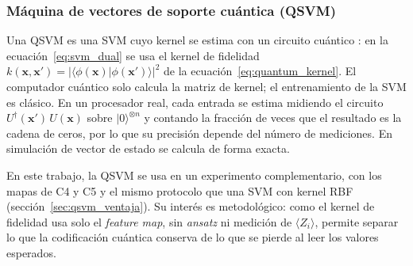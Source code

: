 
\subsubsection{Máquina de vectores de soporte cuántica (QSVM)}
\label{sec:qsvm}

Una QSVM es una SVM cuyo kernel se estima con un circuito cuántico \cite{havlicek2019supervised}: en la ecuación~\eqref{eq:svm_dual} se usa el kernel de fidelidad $k(\mathbf{x},\mathbf{x}') = |\langle \phi(\mathbf{x}) | \phi(\mathbf{x}') \rangle|^2$ de la ecuación~\eqref{eq:quantum_kernel}. El computador cuántico solo calcula la matriz de kernel; el entrenamiento de la SVM es clásico. En un procesador real, cada entrada se estima midiendo el circuito $U^{\dagger}(\mathbf{x}')\,U(\mathbf{x})$ sobre $|0\rangle^{\otimes n}$ y contando la fracción de veces que el resultado es la cadena de ceros, por lo que su precisión depende del número de mediciones. En simulación de vector de estado se calcula de forma exacta.

En este trabajo, la QSVM se usa en un experimento complementario, con los mapas de C4 y C5 y el mismo protocolo que una SVM con kernel RBF (sección~\ref{sec:qsvm_ventaja}). Su interés es metodológico: como el kernel de fidelidad usa solo el \textit{feature map}, sin \textit{ansatz} ni medición de $\langle Z_i \rangle$, permite separar lo que la codificación cuántica conserva de lo que se pierde al leer los valores esperados.
